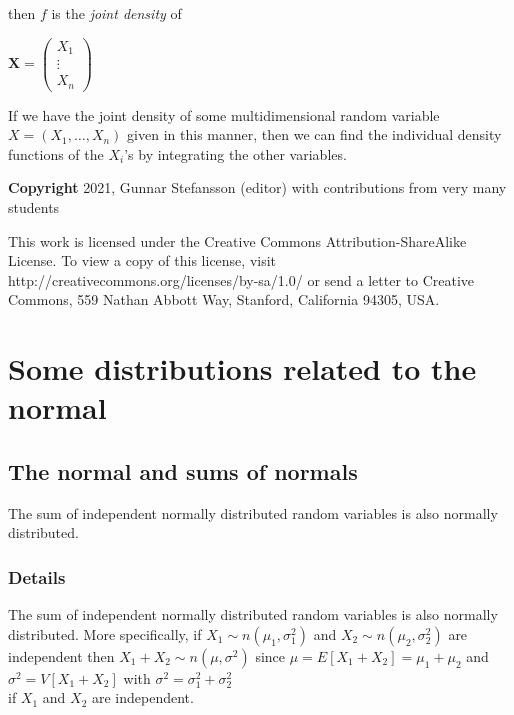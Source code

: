\documentclass[12pt,a4paper]{article}
\theoremstyle{regla}
\theoremstyle{remark}
\theoremstyle{definition}
\theoremstyle{nonumberbreak}
\begin{document}
then $f$ is the {\em joint density} of

$\mathbf{X}= \left( \begin{array}{ccc}
X_1 \\ 
\vdots \\
X_n
\end{array}\right)$

If we have the joint density of some multidimensional random variable $X=(X_1,\ldots,X_n)$ given in this manner, then we can find the individual density functions of the $X_i$'s by integrating the other variables.

{\bf Copyright}
2021, Gunnar Stefansson (editor) with contributions from very many students

This work is licensed under the Creative Commons
Attribution-ShareAlike License. To view a copy of this license, visit
http://creativecommons.org/licenses/by-sa/1.0/ or send a letter to
Creative Commons, 559 Nathan Abbott Way, Stanford, California 94305,
USA.
\clearpage
\section{Some distributions related to the normal}
\subsection{The normal and sums of normals}
\begin{fbox}
\begin{minipage}{0.97\textwidth}
The sum of independent normally distributed random variables is also normally distributed. 
\end{minipage}
\end{fbox}
\subsubsection{Details}
The sum of independent normally distributed random variables is also normally distributed. More specifically, if $X_1 \sim n(\mu_1, \sigma_{1}^2)$ and $X_2 \sim n(\mu_2, \sigma_{2}^2)$ are independent then $X_1 + X_2 \sim n(\mu, \sigma^2)$ since $\mu = E \left[ X_1 + X_2 \right] = \mu_1 + \mu_2$ and \\
$\sigma^2 = V \left[ X_1 + X_2 \right]$ with $\sigma^2 = \sigma_{1}^2 + \sigma_{2}^2 $ \\
if $X_1$ and $X_2$ are independent. \\
\end{document}
